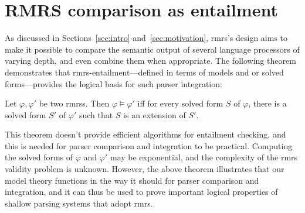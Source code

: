 \section{RMRS comparison as entailment}
\label{sec:entailment}

As discussed in Sections~\ref{sec:intro} and~\ref{sec:motivation}, 
{\sc rmrs}'s design aims to make it possible to compare
the semantic output of several language processors of varying depth,
and even combine them when appropriate.  The following theorem 
demonstrates that {\sc rmrs}-entailment---defined in terms of
models and or solved forms---provides the logical 
basis for such parser integration:

%
\begin{thm}\label{thm:big-one}
  Let $\varphi, \varphi'$ be two {\sc rmrs}s.  Then $\varphi \models
  \varphi'$ iff for every solved form $S$ of $\varphi$, there is a
  solved form $S'$ of $\varphi'$ such that $S$ is an extension of
  $S'$.
\end{thm}

This theorem doesn't provide 
efficient
algorithms for entailment checking, and this is needed
for parser comparison and integration to be
practical.  Computing the solved forms of $\varphi$ and $\varphi'$ may
be exponential, and the complexity of the {\sc rmrs} validity problem
is unknown.  However, the above theorem illustrates that our
model theory functions in the way it should for parser
comparison and integration, and it can thus be used to prove important
logical properties of shallow parsing systems that adopt {\sc rmrs}.

